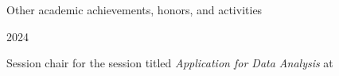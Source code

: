 \documentclass[
	a4paper, %
	10pt, %
]{tresume} %
\begin{document}
\begin{tSection}{Other academic achievements, honors, and activities}
  \begin{tSubsection}{2024}{}{}{}
    \item Session chair for the session titled \emph{Application for Data
        Analysis} at~
  \end{tSubsection}

\end{tSection}
\vfill
\ifpublic{%
    \ifgdpr{%
    
    
  }
  \fi
}
\fi
\end{document}
